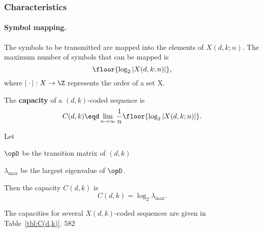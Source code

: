 \subsubsection{Characteristics}
\paragraph{Symbol mapping.}
The symbols to be transmitted are mapped into the elements of 
$X(d,k;n)$.
The maximum number of symbols that can be mapped is
   \[ \floor{\log_2\left| X(d,k;n)\right|}, \]
where $|\cdot|:X\to\Z$ represents the order of a set X.

\begin{definition}
The {\bf capacity} of a $(d,k)$-coded sequence is
\[
   C(d,k) \eqd \lim_{n\to\infty}\frac{1}{n}
               \floor{\log_2\left| X(d,k;n)\right|}.
\]
\end{definition}

\begin{theorem}
Let 
\begin{liste}
   \item $\opD$ be the transition matrix of $(d,k)$
   \item $\lambda_{\mathrm{max}}$ be the largest eigenvalue of $\opD$.
\end{liste}

Then the capacity $C(d,k)$ is
\[
   C(d,k) = \log_2 \lambda_{\mathrm{max}}.
\]
\end{theorem}

The capacities for several $X(d,k)$-coded sequences are given in 
Table~\ref{tbl:C(d,k)}. \citep{proakis}{582}


